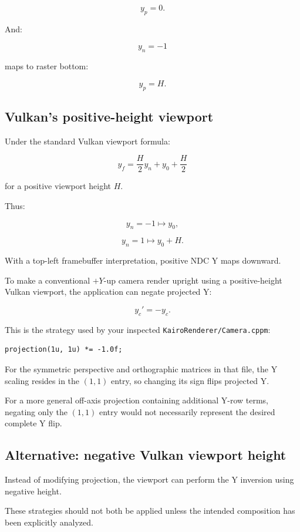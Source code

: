 \[
 y_p=0.
\]

And:

\[
 y_n=-1
\]

maps to raster bottom:

\[
 y_p=H.
\]

\subsection{Vulkan's positive-height viewport}\label{02-foundations-ii-ch033-vulkans-positive-height-viewport}

Under the standard Vulkan viewport formula:

\[
 y_f=\frac{H}{2}y_n+y_0+\frac H2
\]

for a positive viewport height \(H\).

Thus:

\[
 y_n=-1\mapsto y_0,
\]

\[
 y_n=1\mapsto y_0+H.
\]

With a top-left framebuffer interpretation, positive NDC Y maps downward.

To make a conventional \(+Y\)-up camera render upright using a positive-height Vulkan viewport, the application can negate projected Y:

\[
 \boxed{ y_c'=-y_c }.
\]

This is the strategy used by your inspected \texttt{KairoRenderer/Camera.cppm}:

\begin{verbatim}
projection(1u, 1u) *= -1.0f;
\end{verbatim}

For the symmetric perspective and orthographic matrices in that file, the Y scaling resides in the \((1,1)\) entry, so changing its sign flips projected Y.

For a more general off-axis projection containing additional Y-row terms, negating only the \((1,1)\) entry would not necessarily represent the desired complete Y flip.

\subsection{Alternative: negative Vulkan viewport height}\label{02-foundations-ii-ch033-alternative-negative-vulkan-viewport-height}

Instead of modifying projection, the viewport can perform the Y inversion using negative height.

These strategies should not both be applied unless the intended composition has been explicitly analyzed.

